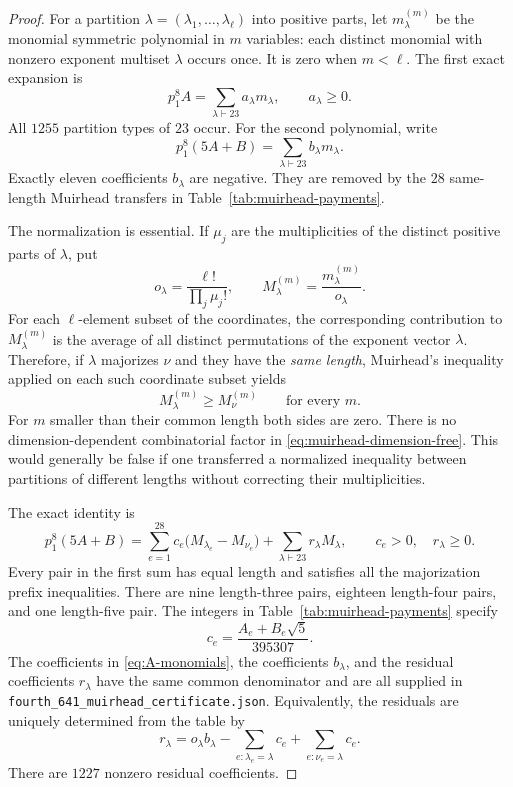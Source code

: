 \documentclass[11pt,a4paper]{article}
\theoremstyle{definition}
\theoremstyle{remark}
\numberwithin{equation}{section}
\begin{document}
\begin{proof}
For a partition $\lambda=(\lambda_1,\ldots,\lambda_\ell)$ into
positive parts, let $m_\lambda^{(m)}$ be the monomial symmetric
polynomial in $m$ variables: each distinct monomial with nonzero
exponent multiset $\lambda$ occurs once.  It is zero when $m<\ell$.
The first exact expansion is
\begin{equation}\label{eq:A-monomials}
 p_1^8A=\sum_{\lambda\vdash23}a_\lambda m_\lambda,
 \qquad a_\lambda\ge0.
\end{equation}
All $1255$ partition types of $23$ occur.  For the second polynomial,
write
\[
 p_1^8(5A+B)=\sum_{\lambda\vdash23}b_\lambda m_\lambda.
\]
Exactly eleven coefficients $b_\lambda$ are negative.  They are
removed by the $28$ same-length Muirhead transfers in
Table~\ref{tab:muirhead-payments}.

The normalization is essential.  If $\mu_j$ are the multiplicities of
the distinct positive parts of $\lambda$, put
\begin{equation}\label{eq:mean-normalization}
 o_\lambda=\frac{\ell!}{\prod_j\mu_j!},\qquad
 M_\lambda^{(m)}=\frac{m_\lambda^{(m)}}{o_\lambda}.
\end{equation}
For each $\ell$-element subset of the coordinates, the corresponding
contribution to $M_\lambda^{(m)}$ is the average of all distinct
permutations of the exponent vector $\lambda$.  Therefore, if
$\lambda$ majorizes $\nu$ and they have the \emph{same length},
Muirhead's inequality\cite{muirhead} applied on each such coordinate subset yields
\begin{equation}\label{eq:muirhead-dimension-free}
 M_\lambda^{(m)}\ge M_\nu^{(m)}\qquad\text{for every }m.
\end{equation}
For $m$ smaller than their common length both sides are zero.
There is no dimension-dependent combinatorial factor in
\eqref{eq:muirhead-dimension-free}.  This would generally be false if
one transferred a normalized inequality between partitions of different
lengths without correcting their multiplicities.

The exact identity is
\begin{equation}\label{eq:muirhead-identity}
 p_1^8(5A+B)=
 \sum_{e=1}^{28}c_e\big(M_{\lambda_e}-M_{\nu_e}\big)
 +\sum_{\lambda\vdash23}r_\lambda M_\lambda,
 \qquad c_e>0,\quad r_\lambda\ge0.
\end{equation}
Every pair in the first sum has equal length and satisfies all the
majorization prefix inequalities.  There are nine length-three pairs,
eighteen length-four pairs, and one length-five pair.
The integers in Table~\ref{tab:muirhead-payments} specify
\[
 c_e=\frac{A_e+B_e\sqrt5}{395307}.
\]
The coefficients in \eqref{eq:A-monomials}, the coefficients
$b_\lambda$, and the residual coefficients $r_\lambda$ have the same
common denominator and are all supplied in
\texttt{fourth\_641\_muirhead\_certificate.json}.
Equivalently, the residuals are uniquely determined from the table by
\begin{equation}\label{eq:muirhead-residual}
 r_\lambda=o_\lambda b_\lambda
       -\sum_{e:\lambda_e=\lambda}c_e
       +\sum_{e:\nu_e=\lambda}c_e.
\end{equation}
There are $1227$ nonzero residual coefficients.


\end{proof}
\end{document}
